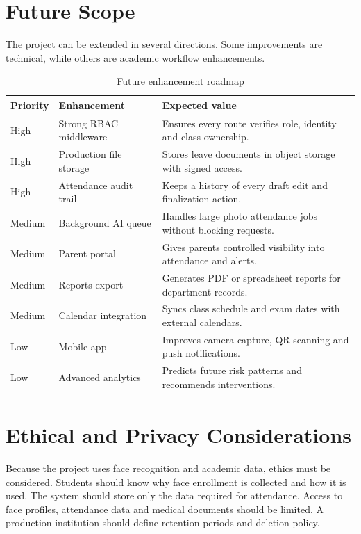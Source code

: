 \section{Future Scope}

The project can be extended in several directions. Some improvements are technical, while others are academic workflow enhancements.

\begin{table}[H]
\centering
\caption{Future enhancement roadmap}
\label{tab:future-roadmap}
\begin{tabularx}{\textwidth}{p{3cm} p{3cm} X}
\toprule
\textbf{Priority} & \textbf{Enhancement} & \textbf{Expected value}\\
\midrule
High & Strong RBAC middleware & Ensures every route verifies role, identity and class ownership.\\
High & Production file storage & Stores leave documents in object storage with signed access.\\
High & Attendance audit trail & Keeps a history of every draft edit and finalization action.\\
Medium & Background AI queue & Handles large photo attendance jobs without blocking requests.\\
Medium & Parent portal & Gives parents controlled visibility into attendance and alerts.\\
Medium & Reports export & Generates PDF or spreadsheet reports for department records.\\
Medium & Calendar integration & Syncs class schedule and exam dates with external calendars.\\
Low & Mobile app & Improves camera capture, QR scanning and push notifications.\\
Low & Advanced analytics & Predicts future risk patterns and recommends interventions.\\
\bottomrule
\end{tabularx}
\end{table}

\section{Ethical and Privacy Considerations}

Because the project uses face recognition and academic data, ethics must be considered. Students should know why face enrollment is collected and how it is used. The system should store only the data required for attendance. Access to face profiles, attendance data and medical documents should be limited. A production institution should define retention periods and deletion policy.

